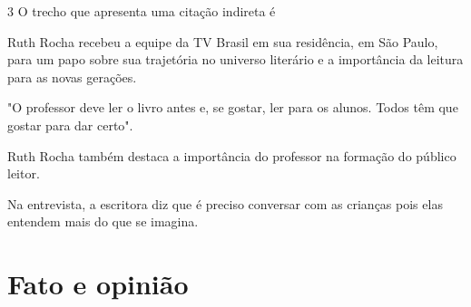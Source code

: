 \num{3} O trecho que apresenta uma citação indireta é

\begin{escolha}
\item Ruth Rocha recebeu a equipe da TV Brasil em sua residência, em São
Paulo, para um papo sobre sua trajetória no universo literário e a
importância da leitura para as novas gerações.
\item "O professor deve ler o livro antes e, se gostar, ler para os alunos.
Todos têm que gostar para dar certo".
\item Ruth Rocha também destaca a importância do professor na formação do
público leitor.
\item Na entrevista, a escritora diz que é preciso conversar com as
crianças pois elas entendem mais do que se imagina. 
\end{escolha}




\chapter{Fato e opinião}

